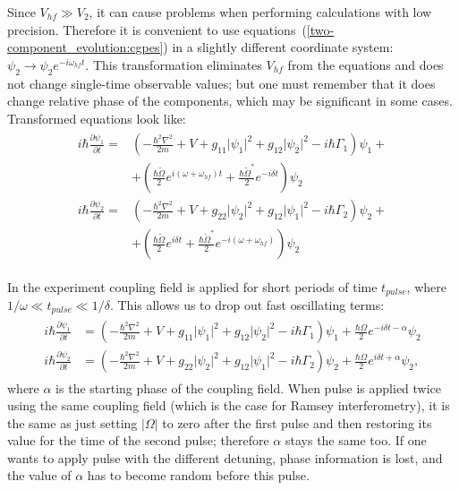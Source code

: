 \documentclass[12pt,notitlepage]{report}
\begin{document}
Since $V_{hf} \gg V_2$, it can cause problems when performing calculations with low precision.
Therefore it is convenient to use equations~(\ref{two-component_evolution:cgpes}) in a slightly different coordinate system:
$\psi_2 \rightarrow \psi_2 e^{-i \omega_{hf} t}$.
This transformation eliminates $V_{hf}$ from the equations and does not change single-time observable values;
but one must remember that it does change relative phase of the components,
which may be significant in some cases.
Transformed equations look like:
\begin{align*}
\begin{split}
i \hbar \frac{\partial \psi_1}{\partial t} = & \left( - \frac{\hbar^2 \nabla^2}{2 m} + V +
g_{11} \lvert \psi_1 \rvert^2 + g_{12} \lvert \psi_2 \rvert^2 - i \hbar \Gamma_1 \right) \psi_1 + \\
& + \left( \frac{\hbar \tilde{\Omega}}{2}e^{i (\omega + \omega_{hf}) t} + \frac{\hbar \tilde{\Omega}^*}{2}e^{-i \delta t} \right) \psi_2 \\
i \hbar \frac{\partial \psi_2}{\partial t} = & \left( - \frac{\hbar^2 \nabla^2}{2 m} + V +
g_{22} \lvert \psi_2 \rvert^2 + g_{12} \lvert \psi_1 \rvert^2 - i \hbar \Gamma_2 \right) \psi_2 + \\
& + \left( \frac{\hbar \tilde{\Omega}}{2}e^{i \delta t} + \frac{\hbar \tilde{\Omega}^*}{2}e^{-i (\omega + \omega_{hf})} \right) \psi_2
\end{split}
\end{align*}

In the experiment coupling field is applied for short periods of time $t_{pulse}$,
where $1 / \omega \ll t_{pulse} \ll 1 / \delta$.
This allows us to drop out fast oscillating terms:
\begin{align}
\label{two-component_evolution:cgpes_simplified}
\begin{split}
i \hbar \frac{\partial \psi_1}{\partial t} & = \left( - \frac{\hbar^2 \nabla^2}{2 m} + V +
g_{11} \lvert \psi_1 \rvert^2 + g_{12} \lvert \psi_2 \rvert^2 - i \hbar \Gamma_1 \right) \psi_1 +
\frac{\hbar \Omega}{2}e^{-i \delta t - \alpha} \psi_2 \\
i \hbar \frac{\partial \psi_2}{\partial t} & = \left( - \frac{\hbar^2 \nabla^2}{2 m} + V +
g_{22} \lvert \psi_2 \rvert^2 + g_{12} \lvert \psi_1 \rvert^2 - i \hbar \Gamma_2 \right) \psi_2 +
\frac{\hbar \Omega}{2}e^{i \delta t + \alpha} \psi_2,
\end{split}
\end{align}
where $\alpha$ is the starting phase of the coupling field.
When pulse is applied twice using the same coupling field (which is the case for Ramsey interferometry),
it is the same as just setting $\lvert \Omega \rvert$ to zero after the first pulse and then restoring its value for the time of the second pulse;
therefore $\alpha$ stays the same too.
If one wants to apply pulse with the different detuning, phase information is lost,
and the value of $\alpha$ has to become random before this pulse.
\end{document}
